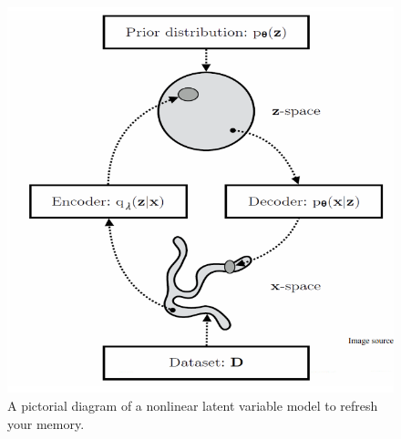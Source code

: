   \begin{figure}[H]
    \centering 
    \includegraphics[scale=0.4]{img/08_VAE/VAE_framework.png}
    \caption{A pictorial diagram of a nonlinear latent variable model to refresh your memory.} 
    \label{fig:vae_framework}
  \end{figure}

